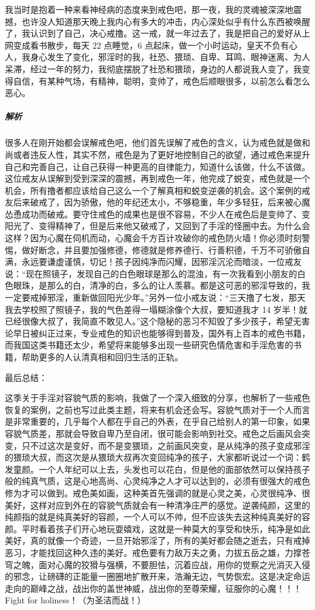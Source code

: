 \begin{case}
    我当时是抱着一种来看神经病的态度来到戒色吧，那一夜，我的灵魂被深深地震撼，也许没人知道那天晚上我内心有多大的冲击，内心深处似乎有什么东西被唤醒了，我认识到了自己，决心戒撸。这一戒，就一年过去了，我是把自己的爱好从上网变成看书散步，每天 22 点睡觉，6 点起床，做一个小时运动，皇天不负有心人，我身心发生了变化，邪淫时的我，社恐、猥琐、自卑、耳鸣、眼神迷离、为人呆滞，经过一年的努力，我彻底摆脱了社恐和猥琐，身边的人都说我人变了，我变得自信，有某种气场，有精神，聪明，变帅了，戒色后顺眼很多，以前怎么看怎么恶心。
    \subparagraph{解析} 很多人在刚开始都会误解戒色吧，他们首先误解了戒色的含义，认为戒色就是做和尚或者违反人性，其实不然，戒色是为了更好地控制自己的欲望，通过戒色来提升自己和完善自己，让自己获得一种更高的自律能力，知道什么该做，什么不该做。这位戒友从误解到受到深深的震撼，再到戒色一年，他完成了蜕变，戒色就是一个机会，所有撸者都应该给自己这么一个了解真相和蜕变逆袭的机会。这个案例的戒友后来破戒了，因为骄傲，他的年纪还太小，不够稳重，年少多轻狂，后来被心魔怂恿成功而破戒。要守住戒色的成果也是很不容易，不少人在戒色后是变帅了、变阳光了、变得精神了，但是后来他又破戒了，又回到了手淫的怪圈中去。为什么会这样？因为心魔在伺机而动，心魔会千方百计攻破你的戒色防火墙！你必须时刻警惕，做好断念，并且要加强修德，修德就是修养德行、行善积德，千万不可骄傲自满，永远要谦虚谨慎，切记！孩子因纯净而闪耀，因邪淫沉沦而暗淡，一位戒友说：“现在照镜子，发现自己的白色眼球是那么的混浊，有一次我看到小朋友的白色眼珠，是那么的白，清净的白，多么的让人羡慕。都是这可恶的邪淫导致的，我一定要戒掉邪淫，重新做回阳光少年。”另外一位小戒友说：“三天撸了七发，那天我去学校照了照镜子，我的气色差得一塌糊涂像个大叔，要知道我才 14 岁半！就已经很像大叔了，我简直不敢见人。”这个隐秘的恶习不知毁了多少孩子，希望无害论早日被纠正过来，专业戒色的知识也能够得到普及，国外有上百本的戒色书籍，而我国这类书籍还太少，希望将来能够多出现一些研究色情危害和手淫危害的书籍，帮助更多的人认清真相和回归生活的正轨。
\end{case}

最后总结：

这季关于手淫对容貌气质的影响，我做了一个深入细致的分享，也解析了一些戒色恢复的案例，之前也写过此类主题，将来有机会还会写。容貌气质对于一个人而言是非常重要的，几乎每个人都在乎自己的外表，在乎自己给别人的第一印象，如果容貌气质差，那就会导致自卑乃至自闭，很可能会影响到社交。戒色之后画风会突变，只不过这次是变好，而不是变猥琐，之前画风突变，是从纯净的孩子变成邪淫的猥琐大叔，而这次是从猥琐大叔再次变回纯净的孩子，大家都听说过一个词：鹤发童颜。一个人年纪可以上去，头发也可以花白，但是他的面部依然可以保持孩子般的纯真气质，这是心地高尚、心灵纯净之人才可以达到的，必须有很强大的戒色修为才可以做到。戒色美如画，这种美首先强调的就是心灵之美，心灵很纯净、很美好，这样对应到外在的容貌气质就会有一种清净庄严的感觉。逆袭纯颜，这里的纯颜指的就是纯真美好的容颜，一个人可以不帅，但不应该失去这种纯真美好的容颜。平时看着孩子们开心地玩耍嬉戏，这就是一种莫大的享受和快乐，纯净是如此美好，真的就像一个奇迹，一旦开始邪淫了，所有的美好都会随之逝去，只有戒掉恶习，才能找回这种久违的美好。戒色要有力敌万夫之勇，力拔五岳之雄，力撑苍穹之魄，面对心魔的狡猾与强横，不要胆怯，沉着应战，用你的觉察之光消灭入侵的邪念，让磅礴的正能量一圈圈地扩散开来，浩瀚无边，气势恢宏。这是决定命运走向的巅峰之战，战出你的盖世神威，战出你的至尊荣耀，征服你的心魔！！！Fight for holiness！（为圣洁而战！）

